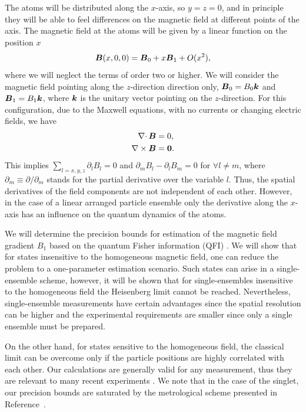 The atoms will be distributed along the $x$-axis, so $y=z=0$, and in principle they will be able to feel differences on the magnetic field at different points of the axis.
The magnetic field at the atoms will be given by a linear function on the position $x$
\begin{equation}
\boldsymbol{B}(x,0,0)=\boldsymbol{B}_0 +x \boldsymbol{B}_1 + O(x^2),
\end{equation}
where we will neglect the terms of order two or higher.
We will consider the magnetic field pointing along the $z$-direction direction only, $\boldsymbol{B}_0=B_0 \boldsymbol{k}$ and $\boldsymbol{B}_1=B_1\boldsymbol{k}$, where $\boldsymbol{k}$ is the unitary vector pointing on the $z$-direction.
For this configuration, due to the Maxwell equations, with no currents or changing electric fields, we have
\begin{align}
\nabla \cdotp \boldsymbol{B}&=0, \nonumber \\
\nabla \times \boldsymbol{B}&=\boldsymbol{0}.
\end{align}
This implies $\sum_{l=x,y,z} \partial_l B_l=0$ and $ \partial_m B_l - \partial_l B_m =0$ for $\forall l\ne m$, where $\partial_m\equiv \partial/\partial_m$ stands for the partial derivative over the variable $l$.
Thus, the spatial derivatives of the field components are not independent of each other.
However, in the case of a linear arranged particle ensemble only the derivative along the $x$-axis has an influence on the quantum dynamics of the atoms.


We will determine the precision bounds for estimation of the magnetic field gradient $B_1$ based on the quantum Fisher information (QFI) \citep{Paris2009,Braunstein1994,Holevo1982,Helstrom1976,Petz2002,Petz2008}.
We will show that for states insensitive to the homogeneous magnetic field, one can reduce the problem to a one-parameter estimation scenario.
Such states can arise in a single-ensemble scheme, however, it will be shown that for single-ensembles insensitive to the homogeneous field the Heisenberg limit cannot be reached.
Nevertheless, single-ensemble measurements have certain advantages since the spatial resolution can be higher and the experimental requirements are smaller since only a single ensemble must be prepared.

On the other hand, for states sensitive to the homogeneous field, the classical limit can be overcome only if the particle positions are highly correlated with each other.
Our calculations are generally valid for any measurement, thus they are relevant to many recent experiments \citep{Wasilewski2010,Eckert2006,Wildermuth2006, Wolfgramm2010,Koschorreck2011,Vengalattore2007,Zhou2010,Behbood2013}.
We note that in the case of the singlet, our precision bounds are saturated by the metrological scheme presented in Reference~\citep{Urizar-Lanz2013}.

